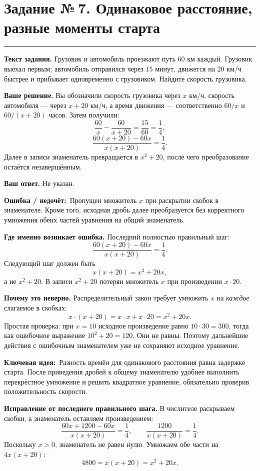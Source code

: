 \documentclass[a4paper,11pt]{article}
\newcommand{\rlabel}[1]{\par\noindent\textbf{\color{darkaccent}#1}\quad}
\newcommand{\errorlabel}{\textcolor{err}{\textbf{Ошибка / недочёт:}}}
\newcommand{\keylabel}{\textcolor{blue!60!black}{\textbf{Ключевая идея:}}}
\newcommand{\tasktitle}[2]{\clearpage\phantomsection\label{task:#1}\section*{Задание №\,#1. #2}\vspace{-3mm}\textcolor{accent}{\rule{\linewidth}{0.45pt}}}
\begin{document}
\tasktitle{7}{Одинаковое расстояние, разные моменты старта}
\rlabel{Текст задания.} Грузовик и автомобиль проезжают путь $60$ км каждый. Грузовик выехал первым; автомобиль отправился через $15$ минут, движется на $20$ км/ч быстрее и прибывает одновременно с грузовиком. Найдите скорость грузовика.

\rlabel{Ваше решение.} Вы обозначили скорость грузовика через $x$ км/ч, скорость автомобиля --- через $x+20$ км/ч, а время движения --- соответственно $60/x$ и $60/(x+20)$ часов. Затем получили:
\[
\frac{60}{x}-\frac{60}{x+20}=\frac{15}{60}=\frac14,
\]
\[
\frac{60(x+20)-60x}{x(x+20)}=\frac14.
\]
Далее в записи знаменатель превращается в $x^2+20$, после чего преобразование остаётся незавершённым.

\rlabel{Ваш ответ.} Не указан.

\par\noindent\errorlabel\ Пропущен множитель $x$ при раскрытии скобок в знаменателе. Кроме того, исходная дробь далее преобразуется без корректного умножения обеих частей уравнения на общий знаменатель.

\rlabel{Где именно возникает ошибка.} Последний полностью правильный шаг:
\[
\frac{60(x+20)-60x}{x(x+20)}=\frac14.
\]
Следующий шаг должен быть
\[
 x(x+20)=x^2+20x,
\]
а не $x^2+20$. В записи $x^2+20$ потерян множитель $x$ при произведении $x\cdot20$.

\rlabel{Почему это неверно.} Распределительный закон требует умножить $x$ на \emph{каждое} слагаемое в скобках:
\[
 x\cdot(x+20)=x\cdot x+x\cdot20=x^2+20x.
\]
Простая проверка: при $x=10$ исходное произведение равно $10\cdot30=300$, тогда как ошибочное выражение $10^2+20=120$. Они не равны. Поэтому дальнейшие действия с ошибочным знаменателем уже не сохраняют исходное уравнение.

\par\noindent\keylabel\ Разность времён для одинакового расстояния равна задержке старта. После приведения дробей к общему знаменателю удобнее выполнить перекрёстное умножение и решить квадратное уравнение, обязательно проверив положительность скорости.

\rlabel{Исправление от последнего правильного шага.} В числителе раскрываем скобки, а знаменатель оставляем произведением:
\[
\frac{60x+1200-60x}{x(x+20)}=\frac14,
\qquad \frac{1200}{x(x+20)}=\frac14.
\]
Поскольку $x>0$, знаменатель не равен нулю. Умножаем обе части на $4x(x+20)$:
\[
 4800=x(x+20)=x^2+20x.
\]
\end{document}
